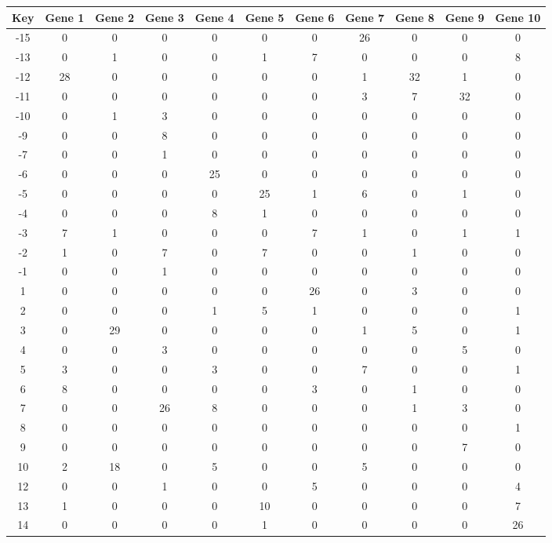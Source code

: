 \begin{tabular}{|c|c|c|c|c|c|c|c|c|c|c|}
\hline
Key & Gene 1 & Gene 2 & Gene 3 & Gene 4 & Gene 5 & Gene 6 & Gene 7 & Gene 8 & Gene 9 & Gene 10 \\
\hline
-15 & 0 & 0 & 0 & 0 & 0 & 0 & 26 & 0 & 0 & 0 \\
-13 & 0 & 1 & 0 & 0 & 1 & 7 & 0 & 0 & 0 & 8 \\
-12 & 28 & 0 & 0 & 0 & 0 & 0 & 1 & 32 & 1 & 0 \\
-11 & 0 & 0 & 0 & 0 & 0 & 0 & 3 & 7 & 32 & 0 \\
-10 & 0 & 1 & 3 & 0 & 0 & 0 & 0 & 0 & 0 & 0 \\
-9 & 0 & 0 & 8 & 0 & 0 & 0 & 0 & 0 & 0 & 0 \\
-7 & 0 & 0 & 1 & 0 & 0 & 0 & 0 & 0 & 0 & 0 \\
-6 & 0 & 0 & 0 & 25 & 0 & 0 & 0 & 0 & 0 & 0 \\
-5 & 0 & 0 & 0 & 0 & 25 & 1 & 6 & 0 & 1 & 0 \\
-4 & 0 & 0 & 0 & 8 & 1 & 0 & 0 & 0 & 0 & 0 \\
-3 & 7 & 1 & 0 & 0 & 0 & 7 & 1 & 0 & 1 & 1 \\
-2 & 1 & 0 & 7 & 0 & 7 & 0 & 0 & 1 & 0 & 0 \\
-1 & 0 & 0 & 1 & 0 & 0 & 0 & 0 & 0 & 0 & 0 \\
1 & 0 & 0 & 0 & 0 & 0 & 26 & 0 & 3 & 0 & 0 \\
2 & 0 & 0 & 0 & 1 & 5 & 1 & 0 & 0 & 0 & 1 \\
3 & 0 & 29 & 0 & 0 & 0 & 0 & 1 & 5 & 0 & 1 \\
4 & 0 & 0 & 3 & 0 & 0 & 0 & 0 & 0 & 5 & 0 \\
5 & 3 & 0 & 0 & 3 & 0 & 0 & 7 & 0 & 0 & 1 \\
6 & 8 & 0 & 0 & 0 & 0 & 3 & 0 & 1 & 0 & 0 \\
7 & 0 & 0 & 26 & 8 & 0 & 0 & 0 & 1 & 3 & 0 \\
8 & 0 & 0 & 0 & 0 & 0 & 0 & 0 & 0 & 0 & 1 \\
9 & 0 & 0 & 0 & 0 & 0 & 0 & 0 & 0 & 7 & 0 \\
10 & 2 & 18 & 0 & 5 & 0 & 0 & 5 & 0 & 0 & 0 \\
12 & 0 & 0 & 1 & 0 & 0 & 5 & 0 & 0 & 0 & 4 \\
13 & 1 & 0 & 0 & 0 & 10 & 0 & 0 & 0 & 0 & 7 \\
14 & 0 & 0 & 0 & 0 & 1 & 0 & 0 & 0 & 0 & 26 \\
\hline
\end{tabular}